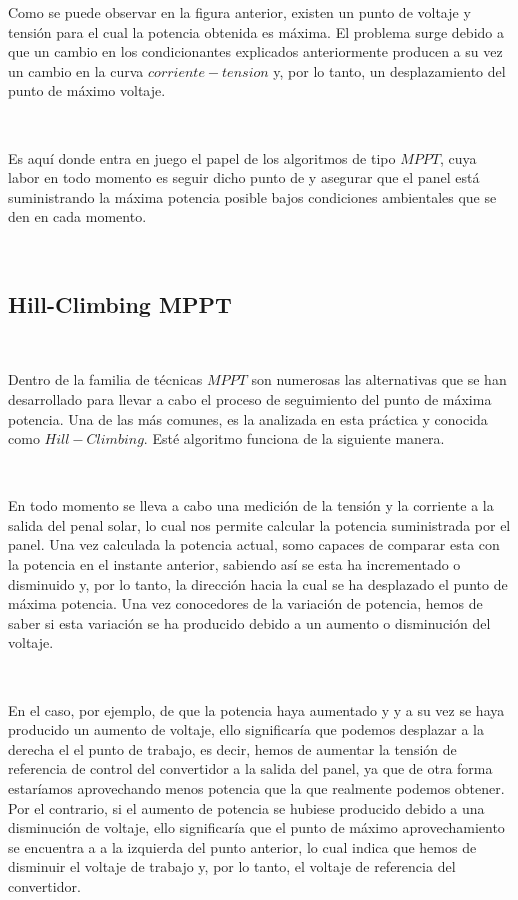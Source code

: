 \documentclass[	DIV=calc,%
							paper=letter,%
							fontsize=12pt%
                            ]{scrartcl}	 					%
\begin{document}
Como se puede observar en la figura anterior, existen un punto de voltaje y tensión para el cual la potencia obtenida es máxima. El problema surge debido a que un cambio en los condicionantes explicados anteriormente producen a su vez un cambio en la curva $corriente-tension$ y, por lo tanto, un desplazamiento del punto de máximo voltaje.

\hfill
\

Es aquí donde entra en juego el papel de los algoritmos de tipo $MPPT$, cuya labor en todo momento es seguir dicho punto de y asegurar que el panel está suministrando la máxima potencia posible bajos  condiciones ambientales que se den en cada momento.

\hfill
\

\subsection{Hill-Climbing MPPT}

\hfill
\

Dentro de la familia de técnicas $MPPT$ son numerosas las alternativas que se han desarrollado para llevar a cabo el proceso de seguimiento del punto de máxima potencia. Una de las más comunes, es la analizada en esta práctica y conocida como $Hill-Climbing$. Esté algoritmo funciona de la siguiente manera.

\hfill
\

 En todo momento se lleva a cabo una medición de la tensión y la corriente a la salida del penal solar, lo cual nos permite calcular la potencia suministrada por el panel. Una vez calculada la potencia actual, somo capaces de comparar esta con la potencia en el instante anterior, sabiendo así se esta ha incrementado o disminuido y, por lo tanto, la dirección hacia la cual se ha desplazado el punto de máxima potencia. Una vez conocedores de la variación de potencia, hemos de saber si esta variación se ha producido debido a un aumento o disminución del voltaje.
 
 \hfill
 \
 
  En el caso, por ejemplo, de que la potencia haya aumentado y y a su vez se haya producido un aumento de voltaje, ello significaría que podemos desplazar a la derecha el el punto de trabajo, es decir, hemos de aumentar la tensión de referencia de control del convertidor a la salida del panel, ya que de otra forma estaríamos aprovechando menos potencia que la que realmente podemos obtener. Por el contrario, si el aumento de potencia se hubiese producido debido a una disminución de voltaje, ello significaría que el punto de máximo aprovechamiento se encuentra a a la izquierda del punto anterior, lo cual indica que hemos de disminuir el voltaje de trabajo y, por lo tanto, el voltaje de referencia del convertidor.
\end{document}
